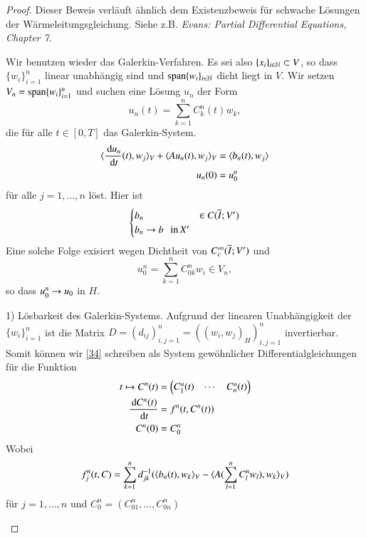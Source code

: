\begin{proof}
    Dieser Beweis verläuft ähnlich dem Existenzbeweis für schwache Lösungen der Wärmeleitungsgleichung.
    Siehe z.B. \textit{Evans: Partial Differential Equations, Chapter 7}.

    \noindent Wir benutzen wieder das Galerkin-Verfahren. Es sei also $\{x_i\}_{i\in \mathbb{N}}\subset V$, so
    dass $\{w_i\}_{i=1}^n$ linear unabhängig sind und $\mathrm{span}\{w_i\}_{i\in\mathbb{N}}$ dicht liegt in $V$. Wir
    setzen $V_n=\mathrm{span}\{w_i\}_{i=1}^n$ und suchen eine Lösung $u_n$ der Form
    \[
        u_n(t)=\sum_{k=1}^n C^n_k(t) w_k,
    \]
    die für alle $t\in [0,T]$ das Galerkin-System.
    \begin{align}\label{34}
        \begin{split}
        \langle \frac{\, \mathrm{d} u_n}{\, \mathrm{d} t}(t), w_j\rangle _V + \langle Au_n(t),w_j\rangle _V &= \langle b_n(t), w_j\rangle\\
        u_n(0)&= u_0^n
        \end{split}
    \end{align}
    für alle $j=1,…,n$ löst. Hier ist
    \[
        \begin{cases} b_n&\in C(\overline I; V') \\ b_n\rightarrow b \hspace{.25cm} \text{in} \, X'\end{cases}
    \]
    Eine solche Folge exisiert wegen Dichtheit von $C_c^\infty(\overline I;V')$ und
    \[
        u_0^n=\sum_{k=1}^n C_{0k}^nw_i \in V_n, 
    \]
    so dass $u_0^n\rightarrow u_0$ in $H$.
    \begin{description}
    \item{1)}
        Lösbarkeit des Galerkin-Systems. Aufgrund der linearen Unabhängigkeit der $\{ w_i \}_{i=1}^n$ ist
        die Matrix $D=(d_{ij})_{i,j=1}^n=((w_i,w_j)_H)_{i,j=1}^n$ invertierbar. Somit können wir \ref{34}
        schreiben als System gewöhnlicher Differentialgleichungen für die Funktion
        \begin{align*}
            t\mapsto C^n(t)&=\begin{pmatrix} C_1^n(t) & \cdots & C_n^n(t)\end{pmatrix}\\
            \frac{\, \mathrm{d} C^n(t)}{\, \mathrm{d} t} &= f^n(t,C^n(t))\\
            C^n(0)&= C_0^n
        \end{align*}
        Wobei
        \[
            f_j^n(t,C)=\sum_{k=1}^n d_{jk}^{-1} (\langle b_n(t), w_k\rangle_V-\langle A(\sum_{l=1}^nC_l^nw_l), w_k
            \rangle_V)
        \]
        für $j=1,…,n$ und $C_0^n=(C_{01}^n, … , C_{0n}^n)$
    \end{description}\[ \]
\end{proof}
